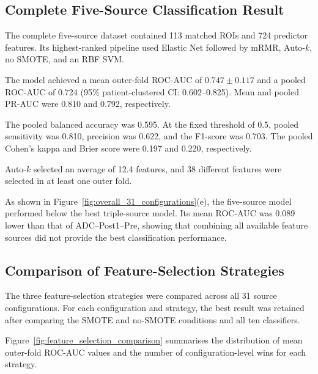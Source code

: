 \documentclass[12pt,twocolumn]{article}
\begin{document}
\subsection{Complete Five-Source Classification Result}
\label{subsec:five_source_results}

The complete five-source dataset contained 113 matched ROIs and 724
predictor features. Its highest-ranked pipeline used Elastic Net
followed by mRMR, Auto-\(k\), no SMOTE, and an RBF SVM.

The model achieved a mean outer-fold ROC-AUC of
\(0.747 \pm 0.117\) and a pooled ROC-AUC of 0.724
(95\% patient-clustered CI: 0.602--0.825). Mean and pooled PR-AUC
were 0.810 and 0.792, respectively.

The pooled balanced accuracy was 0.595. At the fixed threshold of
0.5, pooled sensitivity was 0.810, precision was 0.622, and the
F1-score was 0.703. The pooled Cohen's kappa and Brier score were
0.197 and 0.220, respectively.

Auto-\(k\) selected an average of 12.4 features, and 38 different
features were selected in at least one outer fold.

As shown in Figure~\ref{fig:overall_31_configurations}(e), the
five-source model performed below the best triple-source model. Its
mean ROC-AUC was 0.089 lower than that of ADC--Post1--Pre, showing
that combining all available feature sources did not provide the best
classification performance.

















\subsection{Comparison of Feature-Selection Strategies}
\label{subsec:feature_selection_results}

The three feature-selection strategies were compared across all 31
source configurations. For each configuration and strategy, the best
result was retained after comparing the SMOTE and no-SMOTE conditions
and all ten classifiers.

Figure~\ref{fig:feature_selection_comparison} summarises the
distribution of mean outer-fold ROC-AUC values and the number of
configuration-level wins for each strategy.
\end{document}
